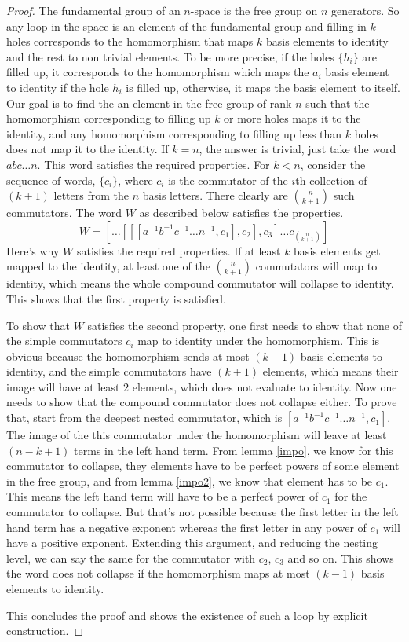 \documentclass[12pt, titlepage]{article}
\theoremstyle{definition}
\begin{document}
\begin{proof}
The fundamental group of an $n$-space is the free group on $n$ generators. So any loop in the space is an element of the fundamental group and filling in $k$ holes corresponds to the homomorphism that maps $k$ basis elements to identity and the rest to non trivial elements. To be more precise, if the holes $\{h_i\}$ are filled up, it corresponds to the homomorphism which maps the $a_i$ basis element to identity if the hole $h_i$ is filled up, otherwise, it maps the basis element to itself. Our goal is to find the an element in the free group of rank $n$ such that the homomorphism corresponding to filling up $k$ or more holes maps it to the identity, and any homomorphism corresponding to filling up less than $k$ holes does not map it to the identity.
If $k=n$, the answer is trivial, just take the word $abc\ldots n$. This word satisfies the required properties. For $k<n$, consider the sequence of words, $\{c_i\}$, where $c_i$ is the commutator of the $i$th collection of $(k+1)$ letters from the $n$ basis letters. There clearly are $n \choose {k+1}$ such commutators. The word $W$ as described below satisfies the properties.
$$W = \left[ \ldots [[[a^{-1}b^{-1}c^{-1}\ldots n^{-1}, c_1], c_2], c_3] \ldots c_{n \choose{k+1}}\right]$$
Here's why $W$ satisfies the required properties. If at least $k$ basis elements get mapped to the identity, at least one of the $n \choose{k+1}$ commutators will map to identity, which means the whole compound commutator will collapse to identity. This shows that the first property is satisfied.

To show that $W$ satisfies the second property, one first needs to show that none of the simple commutators $c_i$ map to identity under the homomorphism. This is obvious because the homomorphism sends at most $(k-1)$ basis elements to identity, and the simple commutators have $(k+1)$ elements, which means their image will have at least $2$ elements, which does not evaluate to identity. Now one needs to show that the compound commutator does not collapse either. To prove that, start from the deepest nested commutator, which is $[a^{-1}b^{-1}c^{-1}\ldots n^{-1}, c_1]$. The image of the this commutator under the homomorphism will leave at least $(n-k+1)$ terms in the left hand term. From lemma \autoref{impo}, we know for this commutator to collapse, they elements have to be perfect powers of some element in the free group, and from lemma \autoref{impo2}, we know that element has to be $c_1$. This means the left hand term will have to be a perfect power of $c_1$ for the commutator to collapse. But that's not possible because the first letter in the left hand term has a negative exponent whereas the first letter in any power of $c_1$ will have a positive exponent. Extending this argument, and reducing the nesting level, we can say the same for the commutator with $c_2$, $c_3$ and so on. This shows the word does not collapse if the homomorphism maps at most $(k-1)$ basis elements to identity.

This concludes the proof and shows the existence of such a loop by explicit construction.
\end{proof}
\end{document}
